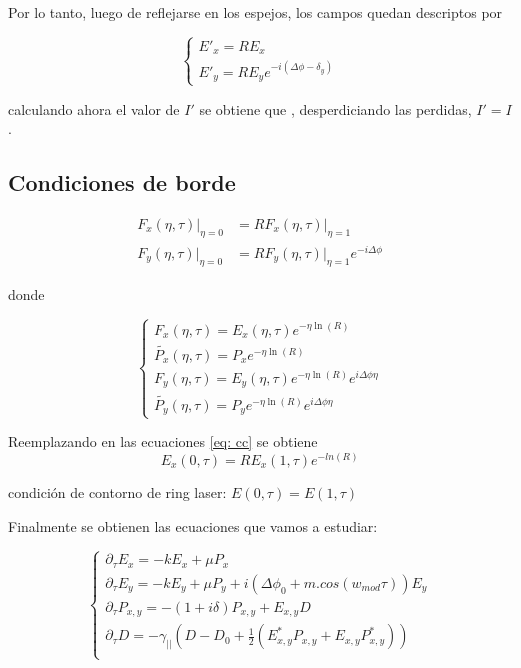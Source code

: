 				Por lo tanto, luego de reflejarse en los espejos, los campos quedan descriptos por 
				
				\begin{equation}
				\begin{cases}
				
				E'_x=R E_x\\
				E'_y=R E_y e^{-i(\Delta \phi - \delta_y)}
				\end{cases}
				\end{equation}
				
				calculando ahora el valor de $I'$ se obtiene que , desperdiciando las perdidas, $I'=I$.
				
				\subsection{Condiciones de borde}
				
				
			
				\begin{align}
				F_x(\eta,\tau)|_{\eta=0}&=R F_x(\eta,\tau)|_{\eta=1}\\
				F_y(\eta,\tau)|_{\eta=0}&=R F_y(\eta,\tau)|_{\eta=1} e^{-i\Delta \phi}
				\end{align}
				\label{eq: cc}
			
				
				donde 
				
				\begin{equation}
				\begin{cases}
					F_x(\eta,\tau)=E_x(\eta,\tau)e^{-\eta \ln(R)}\\
					\tilde{P_x}(\eta,\tau)=P_x e^{-\eta \ln(R)}\\			
					F_y(\eta,\tau)=E_y(\eta,\tau)e^{-\eta \ln(R)}e^{i\Delta \phi \eta}\\
					\tilde{P_y}(\eta,\tau)=P_y e^{-\eta \ln(R)}e^{i\Delta \phi \eta}
				\end{cases}
				\end{equation} 			
				
				Reemplazando en las ecuaciones \ref{eq: cc} se obtiene
				\begin{equation}
				E_x(0,\tau)=R E_x(1,\tau)e^{-ln(R)}
				\label{eq: cc2}
				\end{equation}
				
				condición de contorno de ring laser: $E(0,\tau)=E(1,\tau)$
				
		Finalmente se obtienen las ecuaciones que vamos a estudiar:
		
		\[
		\begin{cases}
		\partial_{\tau} E_x=-k E_x + \mu P_x \\
		\partial_{\tau} E_y=-k E_y + \mu P_y + i(\Delta \phi_0 + m.cos(w_{mod}\tau))E_y \\
		\partial_{\tau} P_{x,y}=-(1+i\delta)P_{x,y}+E_{x,y}D \\
		\partial_{\tau} D=-\gamma_{||}(D-D_0+\tfrac{1}{2}(E^*_{x,y}P_{x,y}+E_{x,y}P^*_{x,y})) \\
		\end{cases}
		\label{eq: final eqs 1}
		\]
		
